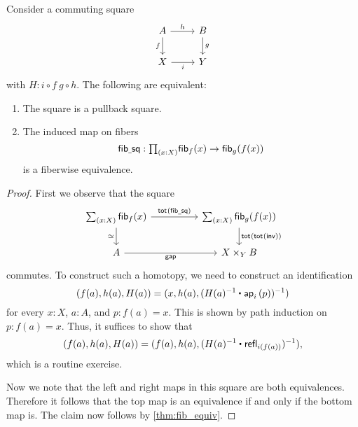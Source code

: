 \begin{thm}\label{cor:pb_fibequiv}
Consider a commuting square
\begin{equation*}
\begin{tikzcd}
A \arrow[d,swap,"f"] \arrow[r,"h"] & B \arrow[d,"g"] \\
X \arrow[r,swap,"i"] & Y
\end{tikzcd}
\end{equation*}
with $H: i\circ f ~ g \circ h$. The following are equivalent:
\begin{enumerate}
\item The square is a pullback square.
\item The induced map on fibers
\begin{equation*}
\mathsf{fib\usc{}sq} : \prd{x:X} \fib{f}{x} \to \fib{g}{f(x)}
\end{equation*}
is a fiberwise equivalence.
\end{enumerate}
\end{thm}

\begin{proof}
First we observe that the square
\begin{equation*}
\begin{tikzcd}[column sep=huge]
\sm{x:X}\fib{f}{x} \arrow[d,swap,"\eqvsym"] \arrow[r,"\total{\mathsf{fib\usc{}sq}}"] &
\sm{x:X}\fib{g}{f(x)} \arrow[d,"\total{\total{\mathsf{inv}}}"] \\
A \arrow[r,swap,"\mathsf{gap}"] & X \times_Y B
\end{tikzcd}
\end{equation*}
commutes. To construct such a homotopy, we need to construct an identification
\begin{equation*}
(f(a),h(a),H(a))=(x,h(a),(\ct{H(a)^{-1}}{\ap{i}{p}})^{-1})
\end{equation*}
for every $x : X$, $a : A$, and $p : f(a) = x$. This is shown by path induction on $p : f(a)=x$. Thus, it suffices to show that
\begin{equation*}
(f(a),h(a),H(a))=(f(a),h(a),(\ct{H(a)^{-1}}{\refl{i(f(a))}})^{-1}),
\end{equation*}
which is a routine exercise. 

Now we note that the left and right maps in this square are both equivalences. Therefore it follows that the top map is an equivalence if and only if the bottom map is. The claim now follows by \cref{thm:fib_equiv}.
\end{proof}


